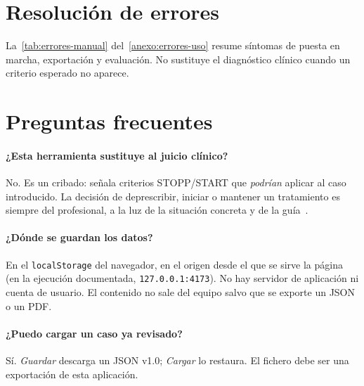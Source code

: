 \section{Resolución de errores}

La~\cref{tab:errores-manual} del~\cref{anexo:errores-uso} resume síntomas
de puesta en marcha, exportación y evaluación. No sustituye el
diagnóstico clínico cuando un criterio esperado no aparece.

\section{Preguntas frecuentes}

\paragraph{¿Esta herramienta sustituye al juicio clínico?}
No. Es un cribado: señala criterios STOPP/START que \emph{podrían}
aplicar al caso introducido. La decisión de deprescribir, iniciar o
mantener un tratamiento es siempre del profesional, a la luz de la
situación concreta y de la guía~\cite{omahony2023stopp,sacyl2023stopp}.

\paragraph{¿Dónde se guardan los datos?}
En el \texttt{localStorage} del navegador, en el origen desde el que se
sirve la página (en la ejecución documentada,
\texttt{127.0.0.1:4173}). No hay servidor de aplicación ni cuenta de
usuario. El contenido no sale del equipo salvo que se exporte un JSON o
un PDF.

\paragraph{¿Puedo cargar un caso ya revisado?}
Sí. \emph{Guardar} descarga un JSON v1.0; \emph{Cargar} lo restaura.
El fichero debe ser una exportación de esta aplicación.

